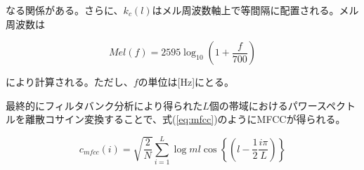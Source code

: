 なる関係がある。さらに、$k_c(l)$はメル周波数軸上で等間隔に配置される。メル周波数は

\begin{equation}
Mel(f)=2595\log_{10}(1+\frac{f}{700})
\end{equation}

により計算される。ただし、$f$の単位は[Hz]にとる。\par
最終的にフィルタバンク分析により得られた$L$個の帯域におけるパワースペクトルを離散コサイン変換することで、式(\ref{eq:mfcc})のようにMFCCが得られる。

\begin{equation}
\label{eq:mfcc}
c_{mfcc}(i)=\sqrt{\frac{2}{N}}\sum_{i=1}^{L}\log ml \cos \left\{ \left( l-\frac{1}{2}\frac{i\pi}{L} \right)\right\}
\end{equation}

